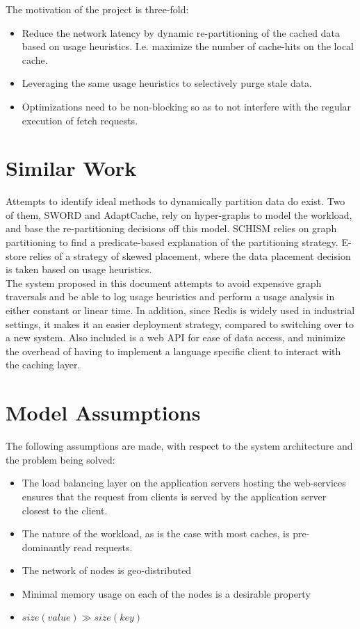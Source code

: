 \documentclass{sig-alternate}
\begin{document}
The motivation of the project is three-fold:
\begin{itemize}
	\item Reduce the network latency by dynamic re-partitioning of the cached data based on usage heuristics. I.e. maximize the number of cache-hits on the local cache.
	\item Leveraging the same usage heuristics to selectively purge stale data.
	\item Optimizations need to be non-blocking so as to not interfere with the regular execution of fetch requests.
\end{itemize}


\section{Similar Work}
Attempts to identify ideal methods to dynamically partition data do exist. Two of them, SWORD\cite{quamar2013sword} and AdaptCache\cite{asad2016adaptcache}, rely on hyper-graphs to model the workload, and base the re-partitioning decisions off this model. SCHISM\cite{curino2010schism} relies on graph partitioning to find a predicate-based explanation of the partitioning strategy. E-store\cite{taft2014store} relies of a strategy of skewed placement, where the data placement decision is taken based on usage heuristics.\\

The system proposed in this document attempts to avoid expensive graph traversals and be able to log usage heuristics and perform a usage analysis in either constant or linear time. In addition, since Redis is widely used in industrial settings, it makes it an easier deployment strategy, compared to switching over to a new system. Also included is a web API for ease of data access, and minimize the overhead of having to implement a language specific client to interact with the caching layer.


\section{Model Assumptions}
The following assumptions are made, with respect to the system architecture and the problem being solved:
\begin{itemize}
	\item The load balancing layer on the application servers hosting the web-services ensures that the request from clients is served by the application server closest to the client. 
	\item The nature of the workload, as is the case with most caches, is pre-dominantly read requests.
	\item The network of nodes is geo-distributed
	\item Minimal memory usage on each of the nodes is a desirable property
	\item $ \displaystyle size(value) \gg size(key)$
\end{itemize}
\end{document}
